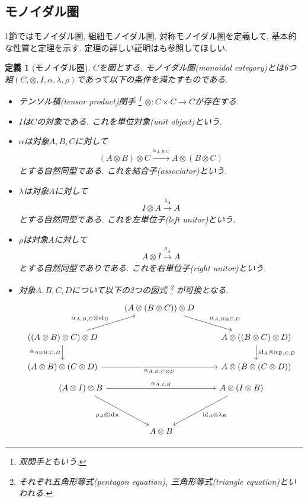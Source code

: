 \documentclass[a4paper,12pt]{ltjsarticle}
\theoremstyle{break}
\newtheorem{defn}[thm]{定義}
\newcommand{\xr}[1]{\xrightarrow{#1}}
\newcommand{\id}{\mathrm{id}}
\newcommand{\al}{\alpha}
\newcommand{\la}{\lambda}
\newcommand{\ot}{\otimes}
\newcommand{\ti}{\times}
\numberwithin{equation}{section}
\begin{document}
\subsection{モノイダル圏}
1節ではモノイダル圏, 組紐モノイダル圏, 対称モノイダル圏を定義して, 基本的な性質と定理を示す. 
定理の詳しい証明は\cite{CWM}も参照してほしい. 

\begin{defn}[モノイダル圏]
  $C$を圏とする. 
  モノイダル圏(monoidal category)とは6つ組$(C,\ot, I, \al, \la, \rho)$であって以下の条件を満たすものである. 
  \begin{itemize}
    \item テンソル積(tensor product)関手
    \footnote{
    双関手ともいう. 
    }
    $\ot: C \ti C \to C$が存在する. 
    \item $I$は$C$の対象である. これを単位対象(unit object)という. 
    \item $\al$は対象$A, B, C$に対して
    \begin{align*}
      (A \ot B) \ot C \xr{\al_{A,B,C}} A \ot (B \ot C)
    \end{align*}
    とする自然同型である. 
    これを結合子(associator)という. 
    \item $\la$は対象$A$に対して
    \begin{align*}
      I \ot A \xr{\la_A} A
    \end{align*}
    とする自然同型である. 
    これを左単位子(left unitor)という. 
    \item $\rho$は対象$A$に対して
    \begin{align*}
      A \ot I \xr{\rho_A} A
    \end{align*}
    とする自然同型でありである. 
    これを右単位子(right unitor)という. 
    \item 対象$A, B, C, D$について以下の2つの図式
      \footnote{
      それぞれ五角形等式(pentagon equation), 三角形等式(triangle equation)といわれる. 
      }
      が可換となる. 
    \[\begin{tikzcd}
      & {(A \ot (B \ot C)) \ot D} \\
      {((A \ot B) \ot C) \ot D} && {A \ot ((B \ot C) \ot D)} \\
      {(A \ot B) \ot (C \ot D)} && {A \ot (B \ot (C \ot D))}
      \arrow["{\al_{A, B, C} \ot \id_D}", from=2-1, to=1-2]
      \arrow["{\al_{A \ot B, C, D}}"', from=2-1, to=3-1]
      \arrow["{\al_{A, B, C \ot D}}"', from=3-1, to=3-3]
      \arrow["{\al_{A, B \ot C, D}}", from=1-2, to=2-3]
      \arrow["{\id_A \ot \al_{B, C ,D}}", from=2-3, to=3-3]
    \end{tikzcd}\]
    \[\begin{tikzcd}
      {(A \ot I) \ot B} &&&& {A \ot (I \ot B)} \\
      \\
      && {A \ot B}
      \arrow["{\al_{A, I, B}}", from=1-1, to=1-5]
      \arrow["{\rho_A \ot \id_B}"', from=1-1, to=3-3]
      \arrow["{\id_A \ot \la_B}", from=1-5, to=3-3]
    \end{tikzcd}\]
  \end{itemize}
\end{defn}
\end{document}
